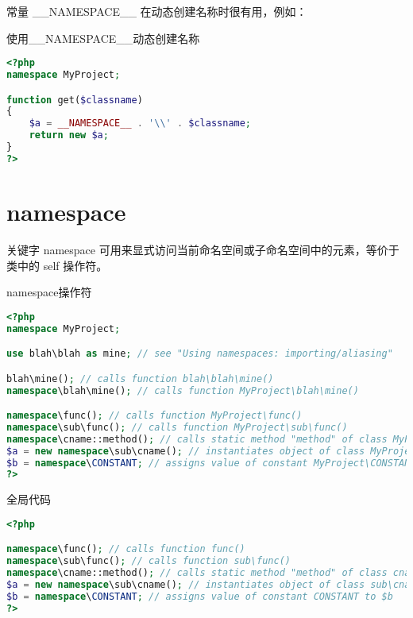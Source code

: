 常量 \_\_NAMESPACE\_\_ 在动态创建名称时很有用，例如：



\begin{example}
使用\_\_NAMESPACE\_\_动态创建名称
\begin{lstlisting}[language=PHP]
<?php
namespace MyProject;

function get($classname)
{
    $a = __NAMESPACE__ . '\\' . $classname;
    return new $a;
}
?>
\end{lstlisting}
\end{example}

\section{namespace}

关键字 namespace 可用来显式访问当前命名空间或子命名空间中的元素，等价于类中的 self 操作符。


\begin{example}
namespace操作符
\begin{lstlisting}[language=PHP]
<?php
namespace MyProject;

use blah\blah as mine; // see "Using namespaces: importing/aliasing"

blah\mine(); // calls function blah\blah\mine()
namespace\blah\mine(); // calls function MyProject\blah\mine()

namespace\func(); // calls function MyProject\func()
namespace\sub\func(); // calls function MyProject\sub\func()
namespace\cname::method(); // calls static method "method" of class MyProject\cname
$a = new namespace\sub\cname(); // instantiates object of class MyProject\sub\cname
$b = namespace\CONSTANT; // assigns value of constant MyProject\CONSTANT to $b
?>
\end{lstlisting}
\end{example}



\begin{example}
全局代码
\begin{lstlisting}[language=PHP]
<?php

namespace\func(); // calls function func()
namespace\sub\func(); // calls function sub\func()
namespace\cname::method(); // calls static method "method" of class cname
$a = new namespace\sub\cname(); // instantiates object of class sub\cname
$b = namespace\CONSTANT; // assigns value of constant CONSTANT to $b
?>
\end{lstlisting}
\end{example}

